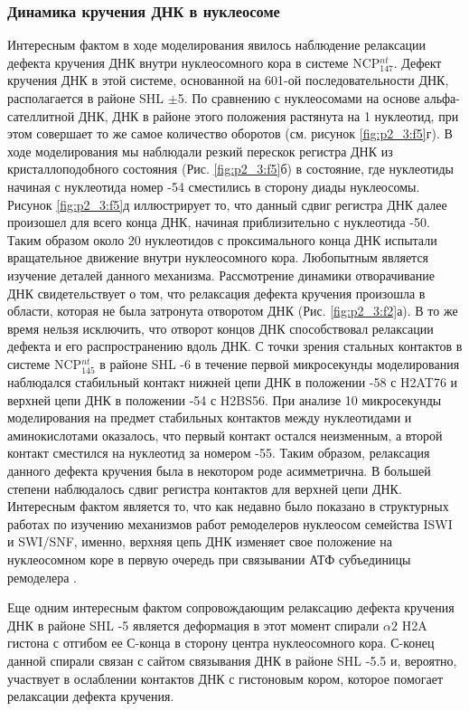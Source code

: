 \subsubsection{Динамика кручения ДНК в нуклеосоме}

Интересным фактом в ходе моделирования явилось наблюдение релаксации дефекта кручения ДНК внутри нуклеосомного кора в системе NCP$_{147}^{nt}$. Дефект кручения ДНК в этой системе, основанной на 601-ой последовательности ДНК, располагается в районе SHL $\pm$5. По сравнению с нуклеосомами на основе альфа-сателлитной ДНК, ДНК в районе этого положения растянута на 1 нуклеотид, при этом совершает то же самое количество оборотов (см. рисунок \ref{fig:p2_3:f5}г). В ходе моделирования мы наблюдали резкий перескок регистра ДНК из кристаллоподобного состояния (Рис. \ref{fig:p2_3:f5}б) в состояние, где нуклеотиды начиная с нуклеотида номер -54 сместились в сторону диады нуклеосомы. Рисунок  \ref{fig:p2_3:f5}д иллюстрирует то, что данный сдвиг регистра ДНК далее произошел для всего конца ДНК, начиная приблизительно с нуклеотида -50. Таким образом около 20 нуклеотидов с проксимального конца ДНК испытали вращательное движение внутри нуклеосомного кора. Любопытным является изучение деталей данного механизма. Рассмотрение динамики отворачивание ДНК свидетельствует о том, что релаксация дефекта кручения произошла в области, которая не была затронута отворотом ДНК (Рис. \ref{fig:p2_3:f2}а). В то же время нельзя исключить, что отворот концов ДНК способствовал релаксации дефекта и его распространению вдоль ДНК. С точки зрения стальных контактов в системе NCP$_{145}^{nt}$ в районе SHL -6 в течение первой микросекунды моделирования наблюдался стабильный контакт нижней цепи ДНК в положении -58 с H2AT76 и верхней цепи ДНК в положении -54 с H2BS56. При анализе 10 микросекунды моделирования на предмет стабильных контактов между нуклеотидами и аминокислотами оказалось, что первый контакт остался неизменным, а второй контакт сместился на нуклеотид за номером -55. Таким образом, релаксация данного дефекта кручения была в некотором роде асимметрична. В большей степени наблюдалось сдвиг регистра контактов для верхней цепи ДНК. Интересным фактом является то, что как недавно было показано в структурных работах по изучению механизмов работ ремоделеров нуклеосом семейства ISWI и SWI/SNF, именно, верхняя цепь ДНК изменяет свое положение на нуклеосомном коре в первую очередь при связывании АТФ субъединицы ремоделера \cite{li_mechanism_2019}.

Еще одним интересным фактом сопровождающим релаксацию дефекта кручения ДНК в районе SHL -5 является деформация в этот момент спирали $\alpha2$ H2A гистона с отгибом ее С-конца в сторону центра нуклеосомного кора. С-конец данной спирали связан с сайтом связывания ДНК в районе SHL -5.5 и, вероятно, участвует в ослаблении контактов ДНК с гистоновым кором, которое помогает релаксации дефекта кручения.


